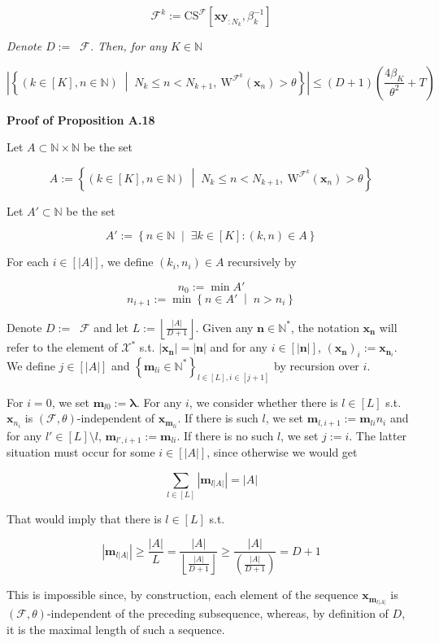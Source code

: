 \documentclass[a4paper]{article}
\newcommand{\Co}[1]{}
\newcommand{\AP}[1]{\left(#1\right)}
\newcommand{\AB}[1]{\left[#1\right]}
\newcommand{\AC}[1]{\left\{#1\right\}}
\newcommand{\ACM}[2]{\left\{#1\;\middle\vert\;#2\right\}}
\newcommand{\Abs}[1]{\left\vert #1 \right\vert}
\newcommand{\Floor}[1]{\left\lfloor #1 \right\rfloor}
\newcommand{\Nats}{\mathbb{N}}
\newcommand{\Estr}{\boldsymbol{\lambda}} %
\DeclareMathOperator{\RVO}{\dim_{RVO}}
\newcommand{\X}{\mathcal{X}}
\newcommand{\F}{\mathcal{F}}
\newcommand{\CS}{\mathrm{CS}}
\newcommand{\W}{\mathrm{W}}
\begin{document}
$$\F^k:=\CS^\F\AB{\boldsymbol{xy}_{:N_k},\beta_k^{-1}}$$

\textit{Denote $D:=\RVO\F$. Then, for any $K\in\Nats$}\Co{i}

$$\Abs{\ACM{\AP{k\in[K],n\in\Nats}}{N_k\leq n<N_{k+1},\ \W^{\F^{k}}\AP{\boldsymbol{x}_{n}}>\theta}}\leq(D+1)\AP{\frac{4\beta_{K}}{\theta^{2}}+T}$$

\textbf{Proof of Proposition A.18}\Co{b}

Let $A\subset\Nats\times\Nats$ be the set

$$A:=\ACM{\AP{k\in[K],n\in\Nats}}{N_k\leq n<N_{k+1},\ \W^{\F^{k}}\AP{\boldsymbol{x}_{n}}>\theta}$$

Let $A'\subset\Nats$ be the set

$$A':=\ACM{n\in\Nats}{\exists k\in[K]:(k,n)\in A}$$

For each $i\in\AB{\Abs{A}}$, we define $\AP{k_i,n_i}\in A$ recursively by

$$n_0:=\min A'$$
$$n_{i+1}:=\min\ACM{n\in A'}{n > n_i}$$

Denote $D:=\RVO{\F}$ and let $L:=\Floor{\frac{\Abs{A}}{D+1}}$. Given any $\boldsymbol{n}\in\Nats^*$, the notation $\boldsymbol{x}_{\boldsymbol{n}}$ will refer to the element of $\X^*$ s.t. $\Abs{\boldsymbol{x}_{\boldsymbol{n}}}=\Abs{\boldsymbol{n}}$ and for any $i\in\AB{\Abs{\boldsymbol{n}}}$, $\AP{\boldsymbol{x}_{\boldsymbol{n}}}_i:=\boldsymbol{x}_{\boldsymbol{n}_i}$. We define $j\in\AB{\Abs{A}}$ and $\AC{\boldsymbol{m}_{li}\in \Nats^*}_{l\in[L],i\in\AB{j+1}}$ by recursion over $i$.

For $i=0$, we set $\boldsymbol{m}_{l0}:=\Estr$. For any $i$, we consider whether there is $l\in[L]$ s.t. $\boldsymbol{x}_{n_i}$ is $(\F,\theta)$-independent of $\boldsymbol{x}_{\boldsymbol{m}_{li}}$. If there is such $l$, we set $\boldsymbol{m}_{l,i+1}:=\boldsymbol{m}_{li}{n_i}$ and for any $l'\in[L]\setminus l$, $\boldsymbol{m}_{l',i+1}:=\boldsymbol{m}_{li}$. If there is no such $l$, we set $j:=i$. The latter situation must occur for some $i\in\AB{\Abs{A}}$, since otherwise we would get

$$\sum_{l\in[L]}\Abs{\boldsymbol{m}_{l\Abs{A}}}=\Abs{A}$$

That would imply that there is $l\in[L]$ s.t.

$$\Abs{\boldsymbol{m}_{l\Abs{A}}}\geq\frac{\Abs{A}}{L}=\frac{\Abs{A}}{\Floor{\frac{\Abs{A}}{D+1}}}\geq\frac{\Abs{A}}{\AP{\frac{\Abs{A}}{D+1}}}=D+1$$

This is impossible since, by construction, each element of the sequence $\boldsymbol{x}_{\boldsymbol{m}_{l\Abs{A}}}$ is $(\F,\theta)$-independent of the preceding subsequence, whereas, by definition of $D$, it is the maximal length of such a sequence.
\end{document}

